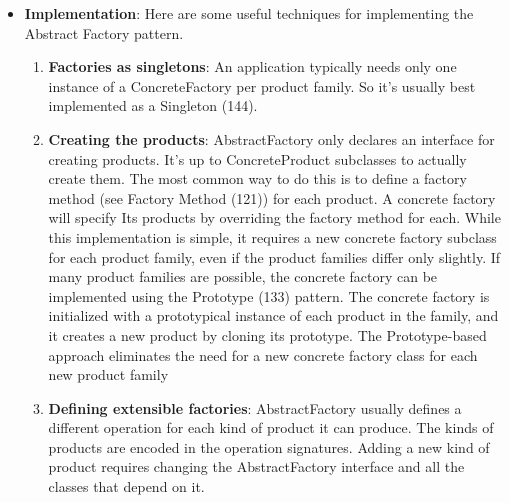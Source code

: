 \documentclass{report}
\begin{document}
\begin{itemize}
\begin{enumerate}
                    \item It promotes consistency among products. When product objects in a family are designed to work together, it's important that an application use objects from only one family at a time. AbstractFactory makes this easy to enforce.
                    \item Supporting new kinds of products is difficult. Extending abstract factories to produce new kinds of Products isn't easy. That's because the AbstractFactory interface fixes the set of products that can be created. Supporting new kinds of products requires extending the factory interface, which involves changing the AbstractFactory class and all of its subclasses. We discuss one solution to this problem in the Implementation section.
                \end{enumerate}
            \item \textbf{Implementation}: Here are some useful techniques for implementing the Abstract Factory pattern.
                \begin{enumerate}
                    \item \textbf{Factories as singletons}: An application typically needs only one instance of a ConcreteFactory per product family. So it's usually best implemented as a Singleton (144).
                    \item \textbf{Creating the products}: AbstractFactory only declares an interface for creating products. It's up to ConcreteProduct subclasses to actually create them. The most common way to do this is to define a factory method (see Factory Method (121)) for each product. A concrete factory will specify Its products by overriding the factory method for each. While this implementation is simple, it requires a new concrete factory subclass for each product family, even if the product families differ only slightly.
                        \bigbreak \noindent 
                        If many product families are possible, the concrete factory can be implemented using the Prototype (133) pattern. The concrete factory is initialized with a prototypical instance of each product in the family, and it creates a new product by cloning its prototype. The Prototype-based approach eliminates the need for a new concrete factory class for each new product family
                    \item \textbf{Defining extensible factories}: AbstractFactory usually defines a different operation for each kind of product it can produce. The kinds of products are encoded in the operation signatures. Adding a new kind of product requires changing the AbstractFactory interface and all the classes that depend on it.

\end{enumerate}
\end{itemize}
\end{document}
